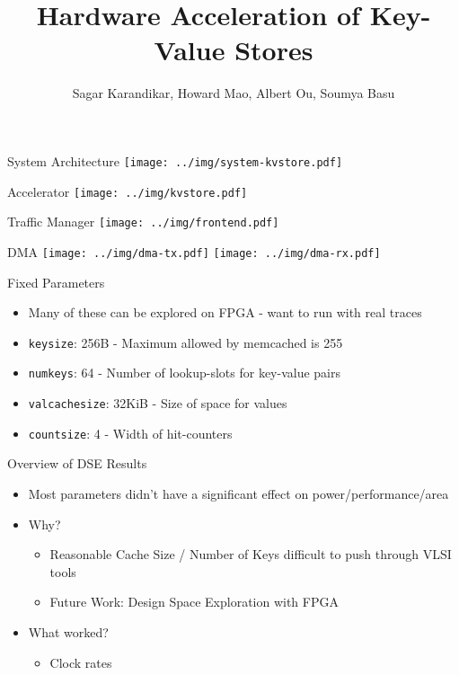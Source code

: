 \documentclass{beamer}
\title{Hardware Acceleration of Key-Value Stores}
\author{Sagar Karandikar, Howard Mao, Albert Ou, Soumya Basu}
\institute[UC Berkeley]{\textsc{University of California, Berkeley}}
\begin{document}
\frame{\titlepage}

\begin{frame}
    
\end{frame}

\begin{frame}{System Architecture}
    \texttt{[image: ../img/system-kvstore.pdf]}
\end{frame}

\begin{frame}{Accelerator}
    \texttt{[image: ../img/kvstore.pdf]}
\end{frame}

\begin{frame}{Traffic Manager}
    \texttt{[image: ../img/frontend.pdf]}
\end{frame}

\begin{frame}{DMA}
    \texttt{[image: ../img/dma-tx.pdf]}
    \texttt{[image: ../img/dma-rx.pdf]}
\end{frame}

\begin{frame}
    
\end{frame}

\begin{frame}{Fixed Parameters}
    \begin{itemize}
        \item Many of these can be explored on FPGA - want to run with real traces
        \item \texttt{keysize}: 256B - Maximum allowed by memcached is 255
        \item \texttt{numkeys}: 64 - Number of lookup-slots for key-value pairs
        \item \texttt{valcachesize}: 32KiB - Size of space for values
        \item \texttt{countsize}: 4 - Width of hit-counters
    \end{itemize}
\end{frame}

\begin{frame}{Overview of DSE Results}
    \begin{itemize}
        \item Most parameters didn't have a significant effect on power/performance/area
        \item Why?
            \begin{itemize}
                \item Reasonable Cache Size / Number of Keys difficult to push through VLSI tools
                \item Future Work: Design Space Exploration with FPGA
            \end{itemize}
        \item What worked?
            \begin{itemize}
                \item Clock rates
            \end{itemize}
    \end{itemize}
\end{frame}
\end{document}
